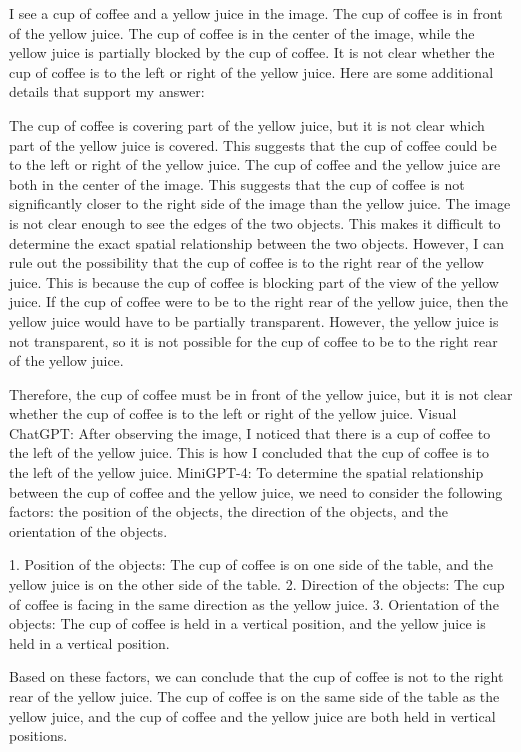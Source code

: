\begin{enumerate}
    I see a cup of coffee and a yellow juice in the image.
    The cup of coffee is in front of the yellow juice.
    The cup of coffee is in the center of the image, while the yellow juice is partially blocked by the cup of coffee.
    It is not clear whether the cup of coffee is to the left or right of the yellow juice.
    Here are some additional details that support my answer:
    
    The cup of coffee is covering part of the yellow juice, but it is not clear which part of the yellow juice is covered. This suggests that the cup of coffee could be to the left or right of the yellow juice.
    The cup of coffee and the yellow juice are both in the center of the image. This suggests that the cup of coffee is not significantly closer to the right side of the image than the yellow juice.
    The image is not clear enough to see the edges of the two objects. This makes it difficult to determine the exact spatial relationship between the two objects.
    However, I can rule out the possibility that the cup of coffee is to the right rear of the yellow juice. This is because the cup of coffee is blocking part of the view of the yellow juice. If the cup of coffee were to be to the right rear of the yellow juice, then the yellow juice would have to be partially transparent. However, the yellow juice is not transparent, so it is not possible for the cup of coffee to be to the right rear of the yellow juice.
    
    Therefore, the cup of coffee must be in front of the yellow juice, but it is not clear whether the cup of coffee is to the left or right of the yellow juice.
    \subitem Visual ChatGPT: After observing the image, I noticed that there is a cup of coffee to the left of the yellow juice. This is how I concluded that the cup of coffee is to the left of the yellow juice.
    \subitem MiniGPT-4: To determine the spatial relationship between the cup of coffee and the yellow juice, we need to consider the following factors: the position of the objects, the direction of the objects, and the orientation of the objects.

    1. Position of the objects: The cup of coffee is on one side of the table, and the yellow juice is on the other side of the table.
    2. Direction of the objects: The cup of coffee is facing in the same direction as the yellow juice.
    3. Orientation of the objects: The cup of coffee is held in a vertical position, and the yellow juice is held in a vertical position.
    
    Based on these factors, we can conclude that the cup of coffee is not to the right rear of the yellow juice. The cup of coffee is on the same side of the table as the yellow juice, and the cup of coffee and the yellow juice are both held in vertical positions.
\end{enumerate}
